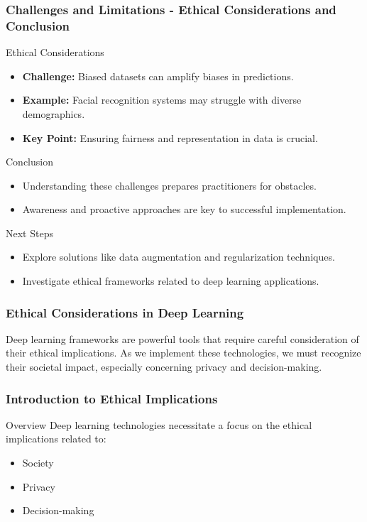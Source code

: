 \documentclass[aspectratio=169]{beamer}
\begin{document}
\begin{frame}[fragile]
    \frametitle{Challenges and Limitations - Ethical Considerations and Conclusion}
    \begin{block}{Ethical Considerations}
        \begin{itemize}
            \item \textbf{Challenge:} Biased datasets can amplify biases in predictions.
            \item \textbf{Example:} Facial recognition systems may struggle with diverse demographics.
            \item \textbf{Key Point:} Ensuring fairness and representation in data is crucial.
        \end{itemize}
    \end{block}

    \begin{block}{Conclusion}
        \begin{itemize}
            \item Understanding these challenges prepares practitioners for obstacles.
            \item Awareness and proactive approaches are key to successful implementation.
        \end{itemize}
    \end{block}

    \begin{block}{Next Steps}
        \begin{itemize}
            \item Explore solutions like data augmentation and regularization techniques.
            \item Investigate ethical frameworks related to deep learning applications.
        \end{itemize}
    \end{block}
\end{frame}

\begin{frame}[fragile]
    \frametitle{Ethical Considerations in Deep Learning}
    Deep learning frameworks are powerful tools that require careful consideration of their ethical implications. As we implement these technologies, we must recognize their societal impact, especially concerning privacy and decision-making.
\end{frame}

\begin{frame}[fragile]
    \frametitle{Introduction to Ethical Implications}
    \begin{block}{Overview}
        Deep learning technologies necessitate a focus on the ethical implications related to:
        \begin{itemize}
            \item Society
            \item Privacy
            \item Decision-making
        \end{itemize}
    \end{block}
\end{frame}
\end{document}
